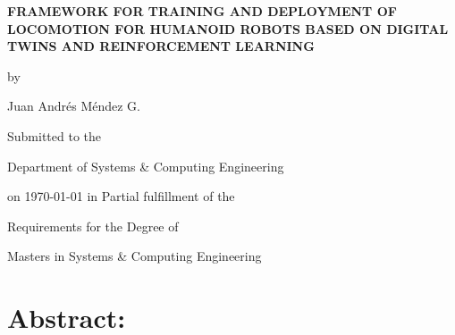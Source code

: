 \documentclass[12pt,a4paper]{article}
\begin{document}
\newpage


\vspace*{10px}

\begin{center}


\Large

 \textbf{FRAMEWORK FOR TRAINING AND DEPLOYMENT OF LOCOMOTION FOR HUMANOID ROBOTS BASED ON DIGITAL TWINS AND REINFORCEMENT LEARNING}
\vspace{1cm}

\large

by

\medskip

Juan Andrés Méndez G.


\bigskip

Submitted to the


Department of Systems \& Computing Engineering


on \today \: in Partial fulfillment of the 


Requirements for the Degree of 

\bigskip

Masters in Systems \& Computing Engineering

\end{center}

\normalsize

\vspace{1cm}


\section*{Abstract:}
\end{document}
